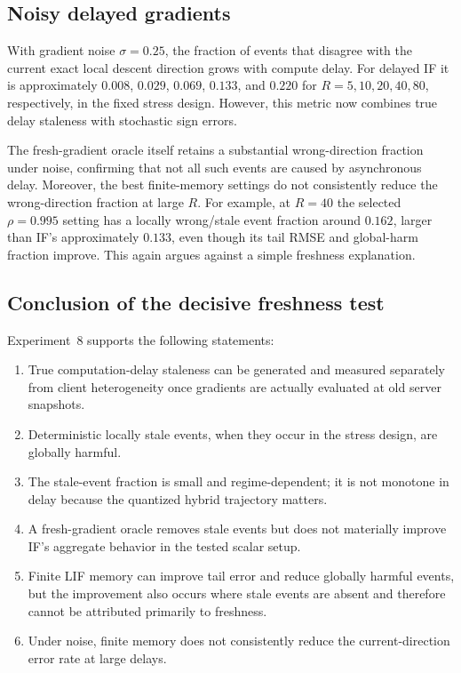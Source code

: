 \subsection{Noisy delayed gradients}

With gradient noise $\sigma=0.25$, the fraction of events that disagree with the current exact local descent direction grows with compute delay. For delayed IF it is approximately $0.008$, $0.029$, $0.069$, $0.133$, and $0.220$ for $R=5,10,20,40,80$, respectively, in the fixed stress design. However, this metric now combines true delay staleness with stochastic sign errors.

The fresh-gradient oracle itself retains a substantial wrong-direction fraction under noise, confirming that not all such events are caused by asynchronous delay. Moreover, the best finite-memory settings do not consistently reduce the wrong-direction fraction at large $R$. For example, at $R=40$ the selected $\rho=0.995$ setting has a locally wrong/stale event fraction around $0.162$, larger than IF's approximately $0.133$, even though its tail RMSE and global-harm fraction improve. This again argues against a simple freshness explanation.

\subsection{Conclusion of the decisive freshness test}

Experiment~8 supports the following statements:
\begin{enumerate}
  \item True computation-delay staleness can be generated and measured separately from client heterogeneity once gradients are actually evaluated at old server snapshots.
  \item Deterministic locally stale events, when they occur in the stress design, are globally harmful.
  \item The stale-event fraction is small and regime-dependent; it is not monotone in delay because the quantized hybrid trajectory matters.
  \item A fresh-gradient oracle removes stale events but does not materially improve IF's aggregate behavior in the tested scalar setup.
  \item Finite LIF memory can improve tail error and reduce globally harmful events, but the improvement also occurs where stale events are absent and therefore cannot be attributed primarily to freshness.
  \item Under noise, finite memory does not consistently reduce the current-direction error rate at large delays.
\end{enumerate}

